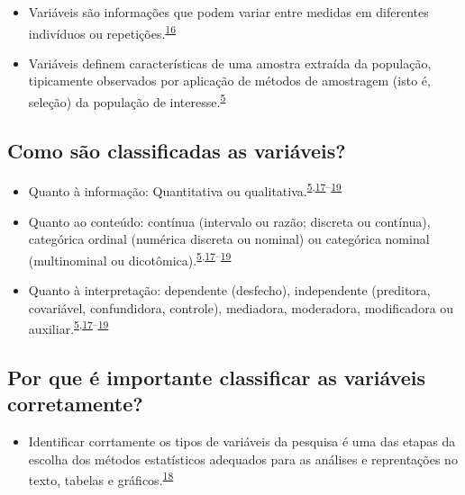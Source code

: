 \documentclass[
]{book}
\providecommand{\tightlist}{%
  \setlength{\itemsep}{0pt}\setlength{\parskip}{0pt}}
\begin{document}
\begin{itemize}
\item
  Variáveis são informações que podem variar entre medidas em diferentes indivíduos ou repetições.\textsuperscript{\protect\hyperlink{ref-Altman1999}{16}}
\item
  Variáveis definem características de uma amostra extraída da população, tipicamente observados por aplicação de métodos de amostragem (isto é, seleção) da população de interesse.\textsuperscript{\protect\hyperlink{ref-vetter2017}{5}}
\end{itemize}

\hypertarget{como-suxe3o-classificadas-as-variuxe1veis}{%
\subsection{Como são classificadas as variáveis?}\label{como-suxe3o-classificadas-as-variuxe1veis}}

\begin{itemize}
\item
  Quanto à informação: Quantitativa ou qualitativa.\textsuperscript{\protect\hyperlink{ref-vetter2017}{5},\protect\hyperlink{ref-Ali2016}{17}--\protect\hyperlink{ref-kaliyadan2019}{19}}
\item
  Quanto ao conteúdo: contínua (intervalo ou razão; discreta ou contínua), categórica ordinal (numérica discreta ou nominal) ou categórica nominal (multinominal ou dicotômica).\textsuperscript{\protect\hyperlink{ref-vetter2017}{5},\protect\hyperlink{ref-Ali2016}{17}--\protect\hyperlink{ref-kaliyadan2019}{19}}
\item
  Quanto à interpretação: dependente (desfecho), independente (preditora, covariável, confundidora, controle), mediadora, moderadora, modificadora ou auxiliar.\textsuperscript{\protect\hyperlink{ref-vetter2017}{5},\protect\hyperlink{ref-Ali2016}{17}--\protect\hyperlink{ref-kaliyadan2019}{19}}
\end{itemize}

\hypertarget{por-que-uxe9-importante-classificar-as-variuxe1veis-corretamente}{%
\subsection{Por que é importante classificar as variáveis corretamente?}\label{por-que-uxe9-importante-classificar-as-variuxe1veis-corretamente}}

\begin{itemize}
\tightlist
\item
  Identificar corrtamente os tipos de variáveis da pesquisa é uma das etapas da escolha dos métodos estatísticos adequados para as análises e reprentações no texto, tabelas e gráficos.\textsuperscript{\protect\hyperlink{ref-Dettori2018}{18}}
\end{itemize}
\end{document}
